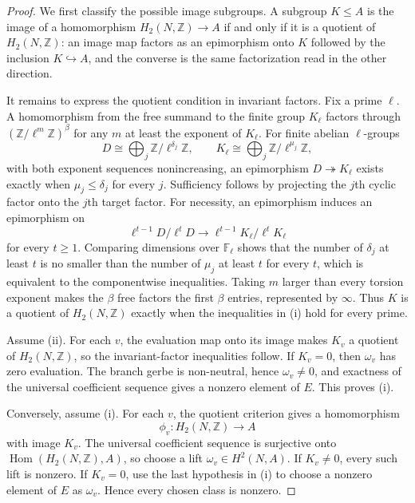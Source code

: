 \begin{proof}
We first classify the possible image subgroups. A subgroup $K\le A$ is the
image of a homomorphism $H_2(N,\mathbb Z)\to A$ if and only if it is a
quotient of $H_2(N,\mathbb Z)$: an image map factors as an epimorphism onto
$K$ followed by the inclusion $K\hookrightarrow A$, and the converse is the
same factorization read in the other direction.

It remains to express the quotient condition in invariant factors. Fix a
prime $\ell$. A homomorphism from the free summand to the finite group
$K_\ell$ factors through $(\mathbb Z/\ell^m\mathbb Z)^\beta$ for any $m$ at
least the exponent of $K_\ell$. For finite abelian $\ell$-groups
\[
D\cong\bigoplus_j\mathbb Z/\ell^{\delta_j}\mathbb Z,
\qquad
K_\ell\cong\bigoplus_j\mathbb Z/\ell^{\mu_j}\mathbb Z,
\]
with both exponent sequences nonincreasing, an epimorphism
$D\twoheadrightarrow K_\ell$ exists exactly when $\mu_j\le\delta_j$ for every
$j$. Sufficiency follows by projecting the $j$th cyclic factor onto the
$j$th target factor. For necessity, an epimorphism induces an epimorphism on
\[
\ell^{t-1}D/\ell^tD\longrightarrow
\ell^{t-1}K_\ell/\ell^tK_\ell
\]
for every $t\ge1$. Comparing dimensions over $\mathbb F_\ell$ shows that the
number of $\delta_j$ at least $t$ is no smaller than the number of $\mu_j$ at
least $t$ for every $t$, which is equivalent to the componentwise
inequalities. Taking $m$ larger than every torsion exponent makes the
$\beta$ free factors the first $\beta$ entries, represented by $\infty$.
Thus $K$ is a quotient of $H_2(N,\mathbb Z)$ exactly when the inequalities in
\textup{(i)} hold for every prime.

Assume \textup{(ii)}. For each $v$, the evaluation map onto its image makes
$K_v$ a quotient of $H_2(N,\mathbb Z)$, so the invariant-factor inequalities
follow. If $K_v=0$, then $\omega_v$ has zero evaluation. The branch gerbe is
non-neutral, hence $\omega_v\ne0$, and exactness of the universal coefficient
sequence gives a nonzero element of $E$. This proves \textup{(i)}.

Conversely, assume \textup{(i)}. For each $v$, the quotient criterion gives
a homomorphism
\[
\phi_v:H_2(N,\mathbb Z)\longrightarrow A
\]
with image $K_v$. The universal coefficient sequence is surjective onto
$\operatorname{Hom}(H_2(N,\mathbb Z),A)$, so choose a lift
$\omega_v\in H^2(N,A)$. If $K_v\ne0$, every such lift is nonzero. If
$K_v=0$, use the last hypothesis in \textup{(i)} to choose a nonzero element
of $E$ as $\omega_v$. Hence every chosen class is nonzero.


\end{proof}
